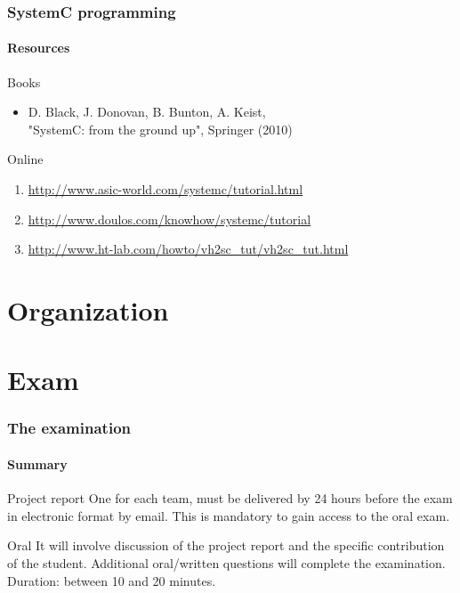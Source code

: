\begin{frame}
\frametitle{SystemC programming}
\framesubtitle{Resources}
\begin{block}{Books}
\begin{itemize}
\item D. Black, J. Donovan, B. Bunton, A. Keist, \\  "SystemC: from the ground up", Springer (2010)
\end{itemize}
\end{block}

\begin{block}{Online}
\begin{enumerate}
\item \url{http://www.asic-world.com/systemc/tutorial.html}
\item \url{http://www.doulos.com/knowhow/systemc/tutorial}
\item \url{http://www.ht-lab.com/howto/vh2sc_tut/vh2sc_tut.html}
\end{enumerate}
\end{block}

\end{frame}

\section{Organization}

\section{Exam}

\begin{frame}
\frametitle{The examination}
\framesubtitle{Summary}
\begin{block}{Project report}
One for each team, must be delivered by 24 hours before the exam in electronic format by email. This is mandatory to gain
access to the oral exam.
\end{block}

\begin{block}{Oral}
It will involve discussion of the project report and the specific contribution of the student. Additional
oral/written questions will complete the examination. Duration: between 10 and 20 minutes.
\end{block}

\end{frame}

